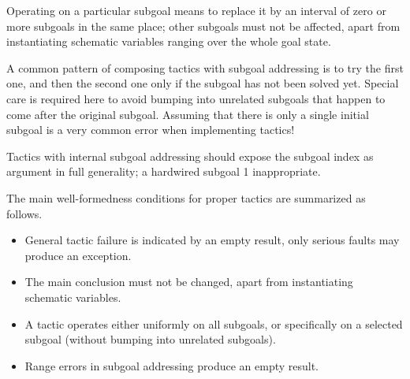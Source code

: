 \begin{isabellebody}
\begin{isamarkuptext}
  Operating on a particular subgoal means to replace it by an interval
  of zero or more subgoals in the same place; other subgoals must not
  be affected, apart from instantiating schematic variables ranging
  over the whole goal state.

  A common pattern of composing tactics with subgoal addressing is to
  try the first one, and then the second one only if the subgoal has
  not been solved yet.  Special care is required here to avoid bumping
  into unrelated subgoals that happen to come after the original
  subgoal.  Assuming that there is only a single initial subgoal is a
  very common error when implementing tactics!

  Tactics with internal subgoal addressing should expose the subgoal
  index as  argument in full generality; a hardwired
  subgoal 1 inappropriate.
  
  \medskip The main well-formedness conditions for proper tactics are
  summarized as follows.

  \begin{itemize}

  \item General tactic failure is indicated by an empty result, only
  serious faults may produce an exception.

  \item The main conclusion must not be changed, apart from
  instantiating schematic variables.

  \item A tactic operates either uniformly on all subgoals, or
  specifically on a selected subgoal (without bumping into unrelated
  subgoals).

  \item Range errors in subgoal addressing produce an empty result.

  \end{itemize}


\end{isamarkuptext}
\end{isabellebody}
